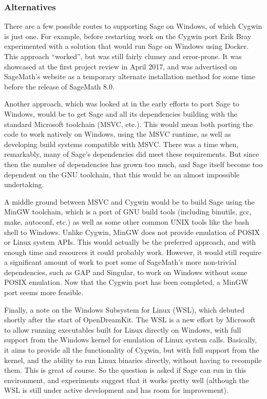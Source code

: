 \hypertarget{alternatives}{%
\subsubsection{Alternatives}\label{alternatives}}

There are a few possible routes to supporting Sage on Windows, of which
Cygwin is just one. For example, before restarting work on the Cygwin
port Erik Bray experimented with a solution that would run Sage on
Windows using Docker. This approach ``worked'', but was still fairly
clumsy and error-prone. It was showcased at the first project review in
April 2017, and was advertised on SageMath's website as a temporary
alternate installation method for some time before the release of
SageMath 8.0.

Another approach, which was looked at in the early efforts to port Sage
to Windows, would be to get Sage and all its dependencies building with
the standard Microsoft toolchain (MSVC, etc.). This would mean both
porting the code to work natively on Windows, using the MSVC runtime, as
well as developing build systems compatible with MSVC. There was a time
when, remarkably, many of Sage's dependencies did meet these
requirements. But since then the number of dependencies has grown too
much, and Sage itself become too dependent on the GNU toolchain, that
this would be an almost impossible undertaking.

A middle ground between MSVC and Cygwin would be to build Sage using the
MinGW toolchain, which is a port of GNU build tools (including binutils,
gcc, make, autoconf, etc.) as well as some other common UNIX tools like
the bash shell to Windows. Unlike Cygwin, MinGW does not provide
emulation of POSIX or Linux system APIs. This would actually be the
preferred approach, and with enough time and resources it could probably
work. However, it would still require a significant amount of work to
port some of SageMath's more non-trivial dependencies, such as GAP and
Singular, to work on Windows without some POSIX emulation. Now that the
Cygwin port has been completed, a MinGW port seems more feasible.

Finally, a note on the Windows Subsystem for Linux (WSL), which debuted
shortly after the start of OpenDreamKit. The WSL is a new effort by
Microsoft to allow running executables built for Linux directly on
Windows, with full support from the Windows kernel for emulation of
Linux system calls. Basically, it aims to provide all the functionality
of Cygwin, but with full support from the kernel, and the ability to run
Linux binaries directly, without having to recompile them. This is great
of course. So the question is asked if Sage can run in this environment,
and experiments suggest that it works pretty well (although the WSL is
still under active development and has room for improvement).


